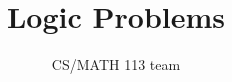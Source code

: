 \documentclass{exam}
\title{Logic Problems}
\author{CS/MATH 113 team}
\begin{document}
\maketitle

\begin{questions}
    
    
\end{questions}
\end{document}
